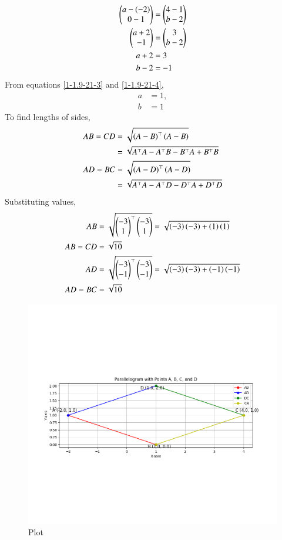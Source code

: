 \documentclass[journal]{IEEEtran}
\begin{document}
 \begin{align}
\begin{pmatrix}a-(-2)\\0-1\end{pmatrix}&=\begin{pmatrix}4-1\\b-2\end{pmatrix}\label{1-1.9-21-1}\\
\begin{pmatrix}a+2\\-1\end{pmatrix}&=\begin{pmatrix}3\\b-2\end{pmatrix}\label{1-1.9-21-2}\\
a+2&=3\label{1-1.9-21-3}\\
b-2&=-1\label{1-1.9-21-4}
\end{align}
 From equations \eqref{1-1.9-21-3} and \eqref{1-1.9-21-4}, 
\begin{align}
a&=1,\\
b&=1
\end{align}
To find lengths of sides,
\begin{align}
AB=CD&=\sqrt{\left(A-B\right)^\top\left(A-B\right)}\\
&=\sqrt{A^\top A-A^\top B -B^\top A+B^\top B }\label{1-1.9-21-5}\\
AD=BC&=\sqrt{\left(A-D\right)^\top\left(A-D\right)}\\
&=\sqrt{A^\top A-A^\top D -D^\top A+D^\top D }\label{1-1.9-21-6}\\
\end{align}
Substituting values,
\begin{align}
AB&=\sqrt{\begin{pmatrix}-3\\1\end{pmatrix}^\top \begin{pmatrix}-3\\1\end{pmatrix}}=\sqrt{\left(-3\right)\left(-3\right)+\left(1\right)\left(1\right)}\\
AB=CD&=\sqrt{10}\label{1-1.9-21-7}\\
AD&=\sqrt{\begin{pmatrix}-3\\-1\end{pmatrix}^\top \begin{pmatrix}-3\\-1\end{pmatrix}}=\sqrt{\left(-3\right)\left(-3\right)+\left(-1\right)\left(-1\right)}\\
AD=BC&=\sqrt{10}\label{1-1.9-21-8}
\end{align}
\begin{figure}[h!]
   \centering
   \includegraphics[width=1.1\columnwidth]{Figs/Figure_1.png}
   \caption{Plot}
   \label{1-1.9-21-fig-1}
\end{figure}
\end{document}
